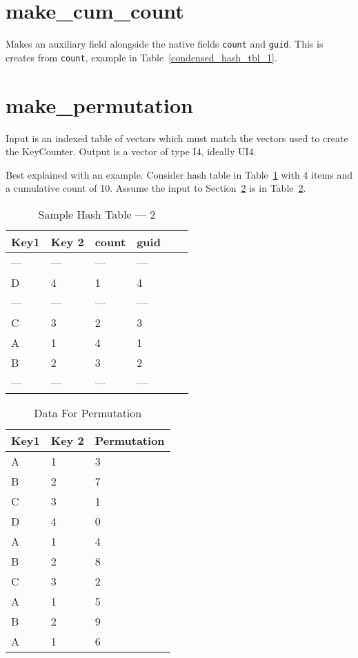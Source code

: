 \section{make\_cum\_count}
\label{make_cum_count}

Makes an auxiliary field alongside the native fields {\tt count}
and {\tt guid}. This is creates from {\tt count}, example in 
Table~\ref{condensed_hash_tbl_1}.

\section{make\_permutation}
\label{make_permutation}
Input is an indexed table of vectors which must match the vectors used to create
the KeyCounter. Output is a vector of type I4, ideally UI4.

Best explained with an example. 
Consider hash table in Table~\ref{hash_tbl_2} with 4 items and a 
cumulative count of 10. Assume the input to Section~\ref{make_permutation} is in
Table~\ref{data_1}. 

\begin{table}
\centering
\begin{tabular}{|l|l||l|l|l||l|} \hline \hline 
{\bf Key1 } & {\bf Key 2} & {\bf count} & {\bf guid} \\ \hline \hline
--- & --- & --- & ---  \\ \hline
  D &  4  &  1  &  4   \\ \hline
--- & --- & --- & ---  \\ \hline
  C &  3  &  2  &  3   \\ \hline
  A &  1  &  4  &  1   \\ \hline
  B &  2  &  3  &  2   \\ \hline
--- & --- & --- & ---  \\ \hline
\hline
\end{tabular}
\caption{Sample Hash Table --- 2}
\label{hash_tbl_2}
\end{table}

\begin{table}
\centering
\begin{tabular}{|l|l||l|} \hline \hline 
{\bf Key1 } & {\bf Key 2} & {\bf Permutation} \\ \hline \hline
A & 1 & 3 \\ \hline
B & 2 & 7 \\ \hline
C & 3 & 1 \\ \hline
D & 4 & 0 \\ \hline
A & 1 & 4 \\ \hline
B & 2 & 8 \\ \hline
C & 3 & 2 \\ \hline
A & 1 & 5 \\ \hline
B & 2 & 9 \\ \hline
A & 1 & 6 \\ \hline
\hline
\end{tabular}
\caption{Data For Permutation}
\label{data_1}
\end{table}
